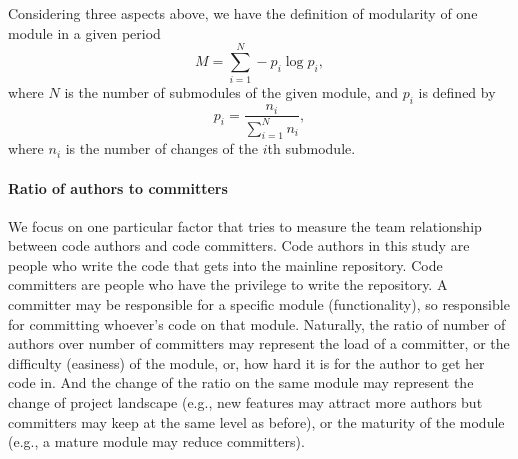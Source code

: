 \documentclass{sig-alternate-05-2015}
\begin{document}
Considering three aspects above, we have the definition of modularity of one module in a given period
\begin{equation}
\label{def_modularity}
M = \sum\limits_{i=1}^{N} - p_{i} \log p_{i}, 
\end{equation}
where $N$ is the number of submodules of the given module, and $p_{i}$ is defined by
\begin{equation}
\label{def_pi}
p_{i} = \frac{n_{i}}{\sum\limits_{i=1}^{N} n_{i}}, 
\end{equation}
where $n_{i}$ is the number of changes of the $i$th submodule.


\paragraph{Ratio of authors to committers}
We focus on one particular factor that tries to measure the team relationship between
code authors and code committers. Code authors in this study are people who
write the code that gets into the mainline repository. Code committers are
people who have the privilege to write the repository. A committer may be
responsible for a specific module (functionality), so responsible for committing
whoever's code on that module. 
Naturally, the ratio of number of authors over number of committers may represent the load of a committer, or the difficulty (easiness) of the module, or, how hard it is for the author to 
get her code in. And the change of the ratio on the same module may represent
the change of project landscape (e.g., new features may attract more authors but
committers may keep at the same level as before), or the maturity of the module (e.g.,
a mature module may reduce committers). 
\end{document}
